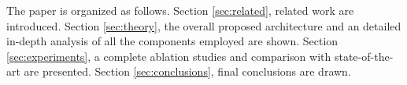 The paper is organized as follows.
Section \ref{sec:related}, related work are introduced.
Section \ref{sec:theory}, the overall proposed architecture and an detailed in-depth analysis of all the components employed are shown.
Section \ref{sec:experiments}, a complete ablation studies and comparison with state-of-the-art are presented.
Section \ref{sec:conclusions}, final conclusions are drawn.